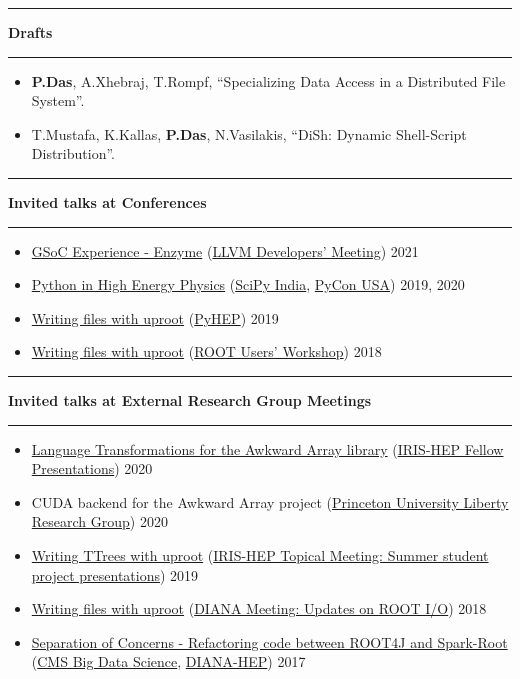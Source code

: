 \documentclass[10pt, letterpaper]{article}
\newcommand{\Section}[1]{
    \Line \par
    \vspace{1pt}
    \textbf{\fontsize{13}{13}\selectfont #1} \par
    \vspace{-7pt}
    \Line \par
    \vspace{3pt}
}
\newcommand{\Line}{
\noindent\rule{\textwidth}{0.4pt}}
\newenvironment{tightitemize}
{
    \vspace{-\topsep}
    \begin{itemize}
        \itemsep2pt \parskip0pt \parsep0pt
}
{
    \end{itemize}
    \vspace{-\topsep}
}
\begin{document}
\Section{Drafts}
\begin{tightitemize}
\item \textbf{P.Das}, A.Xhebraj, T.Rompf, ``Specializing Data Access in a Distributed File System''.
\item T.Mustafa, K.Kallas, \textbf{P.Das}, N.Vasilakis, ``DiSh: Dynamic Shell-Script Distribution''.
\end{tightitemize}

%
%
\Section{Invited talks at Conferences}
\begin{tightitemize}
\item \href{https://youtu.be/mxI9fYbpndI}{GSoC Experience - Enzyme} (\href{https://llvm.swoogo.com/2021devmtg/}{LLVM Developers' Meeting}) \hfill{2021}
\item \href{https://youtu.be/jClVsR6XfdI}{Python in High Energy Physics} (\href{https://scipy.in/2019}{SciPy India}, \href{https://us.pycon.org/2020/}{PyCon USA}) \hfill{2019, 2020}
\item \href{https://indico.cern.ch/event/833895/contributions/3577892/attachments/1927752/3191883/uproot-pyhep.pdf}{Writing files with uproot} (\href{https://indico.cern.ch/event/833895/}{PyHEP}) \hfill{2019}
\item \href{https://indico.cern.ch/event/697389/contributions/3102807/attachments/1713054/2762448/Writing_files_with_uproot.pdf}{Writing files with uproot} (\href{https://indico.cern.ch/event/697389/}{ROOT Users' Workshop}) \hfill{2018}
\end{tightitemize}

\Section{Invited talks at External Research Group Meetings}
\begin{tightitemize}
\item \href{https://indico.cern.ch/event/946427/contributions/3976986/attachments/2094014/3519161/IRIS-HEP-Fellow-Awkward.pdf}{Language Transformations for the Awkward Array library} (\href{https://indico.cern.ch/event/946427/}{IRIS-HEP Fellow Presentations}) \hfill{2020}
\item CUDA backend for the Awkward Array project (\href{https://liberty.princeton.edu/}{Princeton University Liberty Research Group}) \hfill{2020}
\item \href{https://indico.cern.ch/event/840667/contributions/3527109/attachments/1908764/3153297/uproot-irisfellow-final.pdf}{Writing TTrees with uproot} (\href{https://indico.cern.ch/event/840667/}{IRIS-HEP Topical Meeting: Summer student project presentations}) \hfill{2019}
\item \href{https://indico.cern.ch/event/754335/contributions/3166239/attachments/1734208/2804184/Writing_files_with_uproot_-_DIANA_HEP.pdf}{Writing files with uproot} (\href{https://indico.cern.ch/event/754335/}{DIANA Meeting: Updates on ROOT I/O}) \hfill{2018}
\item \href{https://indico.cern.ch/event/658754/contributions/2685907/attachments/1506368/2347492/Refactoring_code_from_spark-root_to_root4j.pdf}{Separation of Concerns - Refactoring code between ROOT4J and Spark-Root} (\href{https://indico.cern.ch/event/658754/}{CMS Big Data Science}, \href{https://indico.cern.ch/event/655833/}{DIANA-HEP}) \hfill{2017}
\end{tightitemize}
\end{document}
